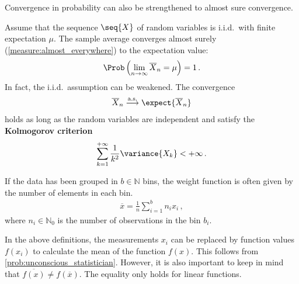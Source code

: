     Convergence in probability can also be strengthened to almost sure convergence.
    \begin{theorem}\label{prob:strong_lln}
        Assume that the sequence $\seq{X}$ of random variables is i.i.d.~with finite expectation $\mu$. The sample average converges almost surely (\cref{measure:almost_everywhere}) to the expectation value:
        \begin{gather}
            \Prob\left(\lim_{n\rightarrow\infty}\overline{X}_n=\mu\right)=1\,.
        \end{gather}
        In fact, the i.i.d.~assumption can be weakened. The convergence
        \begin{gather}
            \overline{X}_n\overset{\text{a.s.}}{\longrightarrow}\expect{\overline{X}_n}
        \end{gather}
        holds as long as the random variables are independent and satisfy the \textbf{Kolmogorov criterion}
        \begin{gather}
            \sum_{k=1}^{+\infty}\frac{1}{k^2}\variance{X_k}<+\infty\,.
        \end{gather}
    \end{theorem}

    \begin{example}\label{statistics:binned_arithmetic_mean}
        If the data has been grouped in $b\in\mathbb{N}$ bins, the weight function is often given by the number of elements in each bin.
        \begin{gather}
            \overline{x} = \frac{1}{n}\sum_{i=1}^bn_ix_i\,,
        \end{gather}
        where $n_i\in\mathbb{N}_0$ is the number of observations in the bin $b_i$.
    \end{example}
    \begin{remark}
        In the above definitions, the measurements $x_i$ can be replaced by function values $f(x_i)$ to calculate the mean of the function $f(x)$. This follows from \cref{prob:unconscious_statistician}. However, it is also important to keep in mind that $\overline{f(x)} \neq f(\overline{x})$. The equality only holds for linear functions.
    \end{remark}

